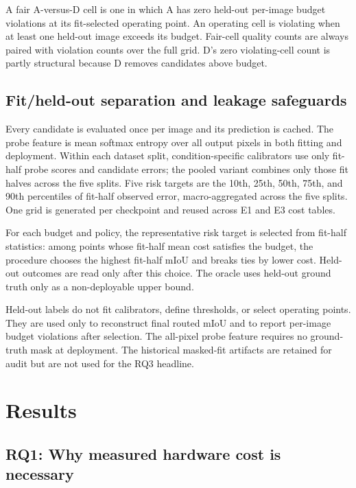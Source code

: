 \documentclass[a4paper,review,12pt]{elsarticle}
\newcommand{\miou}{mIoU}
\begin{document}
A fair A-versus-D cell is one in which A has zero held-out per-image budget violations at its fit-selected operating point. An operating cell is violating when at least one held-out image exceeds its budget. Fair-cell quality counts are always paired with violation counts over the full grid. D's zero violating-cell count is partly structural because D removes candidates above budget.

\subsection{Fit/held-out separation and leakage safeguards}
\label{sec:split}

Every candidate is evaluated once per image and its prediction is cached. The probe feature is mean softmax entropy over all output pixels in both fitting and deployment. Within each dataset split, condition-specific calibrators use only fit-half probe scores and candidate errors; the pooled variant combines only those fit halves across the five splits. Five risk targets are the 10th, 25th, 50th, 75th, and 90th percentiles of fit-half observed error, macro-aggregated across the five splits. One grid is generated per checkpoint and reused across E1 and E3 cost tables.

For each budget and policy, the representative risk target is selected from fit-half statistics: among points whose fit-half mean cost satisfies the budget, the procedure chooses the highest fit-half \miou{} and breaks ties by lower cost. Held-out outcomes are read only after this choice. The oracle uses held-out ground truth only as a non-deployable upper bound.

Held-out labels do not fit calibrators, define thresholds, or select operating points. They are used only to reconstruct final routed \miou{} and to report per-image budget violations after selection. The all-pixel probe feature requires no ground-truth mask at deployment. The historical masked-fit artifacts are retained for audit but are not used for the RQ3 headline.

\section{Results}
\label{sec:results}

\subsection{RQ1: Why measured hardware cost is necessary}
\end{document}

